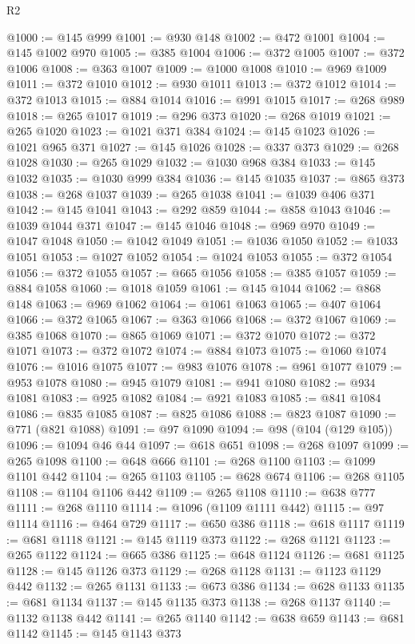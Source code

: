 \begin{lexlean}{R2}
\begin{coremodule}
@1000 := @145 @999
@1001 := @930 @148
@1002 := @472 @1001
@1004 := @145 @1002 @970
@1005 := @385 @1004
@1006 := @372 @1005
@1007 := @372 @1006
@1008 := @363 @1007
@1009 := @1000 @1008
@1010 := @969 @1009
@1011 := @372 @1010
@1012 := @930 @1011
@1013 := @372 @1012
@1014 := @372 @1013
@1015 := @884 @1014
@1016 := @991 @1015
@1017 := @268 @989
@1018 := @265 @1017
@1019 := @296 @373
@1020 := @268 @1019
@1021 := @265 @1020
@1023 := @1021 @371 @384
@1024 := @145 @1023
@1026 := @1021 @965 @371
@1027 := @145 @1026
@1028 := @337 @373
@1029 := @268 @1028
@1030 := @265 @1029
@1032 := @1030 @968 @384
@1033 := @145 @1032
@1035 := @1030 @999 @384
@1036 := @145 @1035
@1037 := @865 @373
@1038 := @268 @1037
@1039 := @265 @1038
@1041 := @1039 @406 @371
@1042 := @145 @1041
@1043 := @292 @859
@1044 := @858 @1043
@1046 := @1039 @1044 @371
@1047 := @145 @1046
@1048 := @969 @970
@1049 := @1047 @1048
@1050 := @1042 @1049
@1051 := @1036 @1050
@1052 := @1033 @1051
@1053 := @1027 @1052
@1054 := @1024 @1053
@1055 := @372 @1054
@1056 := @372 @1055
@1057 := @665 @1056
@1058 := @385 @1057
@1059 := @884 @1058
@1060 := @1018 @1059
@1061 := @145 @1044
@1062 := @868 @148
@1063 := @969 @1062
@1064 := @1061 @1063
@1065 := @407 @1064
@1066 := @372 @1065
@1067 := @363 @1066
@1068 := @372 @1067
@1069 := @385 @1068
@1070 := @865 @1069
@1071 := @372 @1070
@1072 := @372 @1071
@1073 := @372 @1072
@1074 := @884 @1073
@1075 := @1060 @1074
@1076 := @1016 @1075
@1077 := @983 @1076
@1078 := @961 @1077
@1079 := @953 @1078
@1080 := @945 @1079
@1081 := @941 @1080
@1082 := @934 @1081
@1083 := @925 @1082
@1084 := @921 @1083
@1085 := @841 @1084
@1086 := @835 @1085
@1087 := @825 @1086
@1088 := @823 @1087
@1090 := @771 (@821 @1088)
@1091 := @97 @1090
@1094 := @98 (@104 (@129 @105))
@1096 := @1094 @46 @44
@1097 := @618 @651
@1098 := @268 @1097
@1099 := @265 @1098
@1100 := @648 @666
@1101 := @268 @1100
@1103 := @1099 @1101 @442
@1104 := @265 @1103
@1105 := @628 @674
@1106 := @268 @1105
@1108 := @1104 @1106 @442
@1109 := @265 @1108
@1110 := @638 @777
@1111 := @268 @1110
@1114 := @1096 (@1109 @1111 @442)
@1115 := @97 @1114
@1116 := @464 @729
@1117 := @650 @386
@1118 := @618 @1117
@1119 := @681 @1118
@1121 := @145 @1119 @373
@1122 := @268 @1121
@1123 := @265 @1122
@1124 := @665 @386
@1125 := @648 @1124
@1126 := @681 @1125
@1128 := @145 @1126 @373
@1129 := @268 @1128
@1131 := @1123 @1129 @442
@1132 := @265 @1131
@1133 := @673 @386
@1134 := @628 @1133
@1135 := @681 @1134
@1137 := @145 @1135 @373
@1138 := @268 @1137
@1140 := @1132 @1138 @442
@1141 := @265 @1140
@1142 := @638 @659
@1143 := @681 @1142
@1145 := @145 @1143 @373

\end{coremodule}
\end{lexlean}
